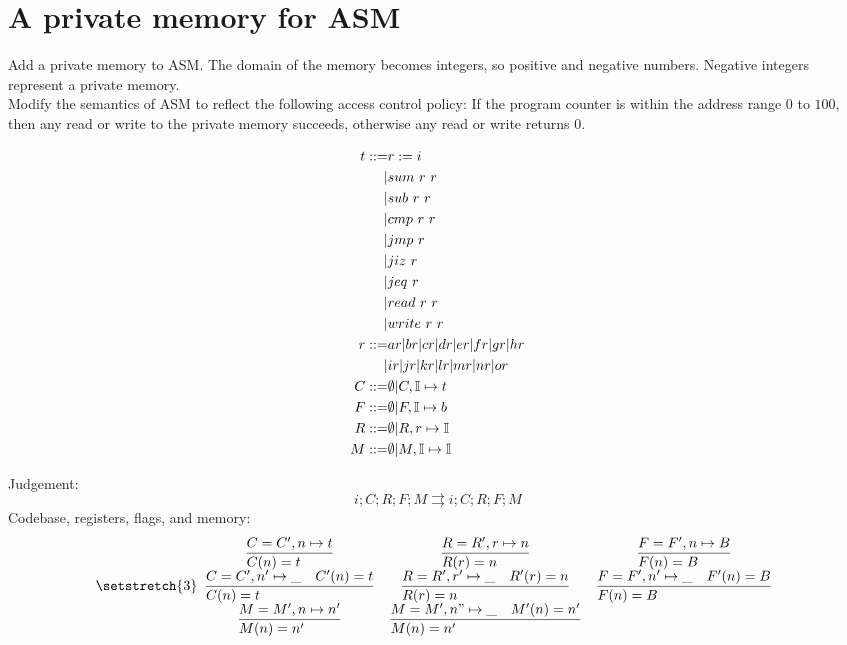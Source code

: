 \documentclass{article}
\begin{document}
\newpage
\section{A private memory for ASM}
Add a private memory to ASM. The domain of the memory becomes integers, so positive and negative numbers. Negative integers represent a private memory. \\
Modify the semantics of ASM to reflect the following access control policy:
If the program counter is within the address range $0$ to $100$, then any read or write to the private memory succeeds, otherwise any read or write returns $0$.

\begin{align*}
    t ::= & r:=i \\
        |& sum\ r\ r \\
        |& sub\ r\ r \\
        |& cmp\ r\ r \\
        |& jmp\ r \\
        |& jiz\ r \\
        |& jeq\ r \\
        |& read\ r\ r \\
        |& write\ r\ r \\
    r ::= & ar|br|cr|dr|er|fr|gr|hr \\
        |&ir|jr|kr|lr|mr|nr|or \\
    C ::=& \emptyset | C,\I\mapsto t \\
    F ::=& \emptyset | F,\I\mapsto b \\
    R ::=& \emptyset | R, r\mapsto \I \\
    M ::=& \emptyset | M, \I\mapsto \I \\
\end{align*}

Judgement:
\begin{equation*}
    i;C;R;F;M \rightrightarrows i;C;R;F;M
\end{equation*}
Codebase, registers, flags, and memory:
\[\setstretch{3} \begin{array}{cccc}
    \st[]{C(n)=t}{C=C',n\mapsto t} &
    \st[]{R(r)=n}{R=R',r\mapsto n} &
    \st[]{F(n)=B}{F=F',n\mapsto B} \\
    \st[]{C(n)=t}{C=C',n'\mapsto \_\quad C'(n)=t} &
    \st[]{R(r)=n}{R=R',r'\mapsto \_\quad R'(r)=n} &
    \st[]{F(n)=B}{F=F',n'\mapsto \_\quad F'(n)=B} \\
    \st[]{M(n)=n'}{M=M',n\mapsto n'} &
    \st[]{M(n)=n'}{M=M',n"\mapsto \_\quad M'(n)=n'} \\
\end{array}\]
\end{document}
